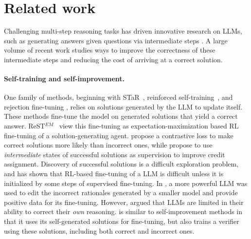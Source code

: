 \section{Related work}
\label{sec:related}


Challenging multi-step reasoning tasks has driven innovative research on LLMs, such as generating answers given questions via intermediate steps \citep{DBLP:conf/nips/Wei0SBIXCLZ22,DBLP:conf/nips/KojimaGRMI22}. A large volume of recent work studies ways to improve the correctness of these intermediate steps and reducing the cost of arriving at a correct solution.

\paragraph{Self-training and self-improvement.} One family of methods, beginning with STaR~\citep{DBLP:conf/nips/ZelikmanWMG22}, reinforced self-training~\citep{gulcehre2023reinforced}, and rejection fine-tuning \citep{yuan2023scaling}, relies on solutions generated by the LLM to update itself. These methods fine-tune the model on generated solutions that yield a correct answer. ReST$^{EM}$~\citep{singh2023human} view this fine-tuning as expectation-maximization based RL fine-tuning of a solution-generating agent. \citet{wang2023making} propose a contrastive loss to make correct solutions more likely than incorrect ones, while \citet{ni2022learning} propose to use \emph{intermediate} states of successful solutions as supervision to improve credit assignment. Discovery of successful solutions is a difficult exploration problem, and \citet{luong2024reft} has shown that RL-based fine-tuning of a LLM is difficult unless it is initialized by some steps of supervised fine-tuning. In \citet{an2023learning}, a more powerful LLM was used to edit the incorrect rationales generated by a smaller model and provide positive data for its fine-tuning. However, \citet{huang2023large} argued that LLMs are limited in their ability to correct their \emph{own} reasoning. \vstar{} is similar to self-improvement methods in that it uses its self-generated solutions for fine-tuning, but also trains a verifier using these solutions, including both correct and incorrect ones.


